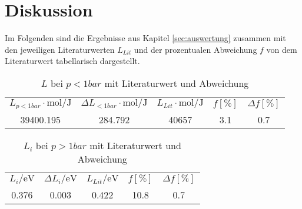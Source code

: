 \section{Diskussion}
\label{sec:Diskussion}
Im Folgenden sind die Ergebnisse aus Kapitel \ref{sec:auswertung} zusammen mit den jeweiligen Literaturwerten
$L_{Lit}$ und der prozentualen Abweichung $f$ von dem Literaturwert tabellarisch dargestellt.
\begin{table}[H]
  \centering
      \caption{$L$ bei $p<1bar$ mit Literaturwert\cite{AP02} und Abweichung}
      \begin{tabular}{S S S S S}
        \toprule
        {$ L_{p<1bar} \cdot \si{\mole\per\joule}$} & {$ \Delta L_{<1bar} \cdot \si{\mole\per\joule}$} & {$ L_{Lit} \cdot \si{\mole\per\joule}$} & {$f [\%]$} & {$\Delta f [\%]$}\\
        39400.195 & 284.792 & 40657 & 3.1 & 0.7\\
        \bottomrule
      \end{tabular}
    \end{table}
\begin{table}[H]
  \centering
      \caption{$L_{i}$ bei $p>1bar$ mit Literaturwert\cite{AP03} und Abweichung}
      \begin{tabular}{S S S S S}
        \toprule
        {$ L_{i} / \si{\electronvolt}$} & {$ \Delta L_{i} / \si{\electronvolt}$} & {$ L_{Lit} / \si{\electronvolt}$} & {$f [\%]$} & {$\Delta f [\%]$}\\
        0.376 & 0.003 & 0.422 & 10.8 & 0.7\\
        \bottomrule
      \end{tabular}
    \end{table}

